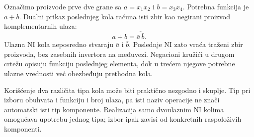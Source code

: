 
Označimo proizvode prve dve grane sa \(a=x_1x_2\) i \(b=x_3x_4\). Potrebna funkcija je \(a+b\). Dualni prikaz poslednjeg kola računa isti zbir kao negirani proizvod komplementarnih ulaza:
\[
a+b=\overline{\bar{a}\,\bar{b}}.
\]
Ulazna NI kola neposredno stvaraju \(\bar{a}\) i \(\bar{b}\). Poslednje NI zato vraća traženi zbir proizvoda, bez zasebnih invertora na međuvezi. Negacioni kružići u drugom crtežu opisuju funkciju poslednjeg elementa, dok u trećem njegove potrebne ulazne vrednosti već obezbeđuju prethodna kola.

Korišćenje dva različita tipa kola može biti praktično nezgodno i skuplje. Tip pri izboru obuhvata i funkciju i broj ulaza, pa isti naziv operacije ne znači automatski isti tip komponente. Realizacija samo dvoulaznim NI kolima omogućava upotrebu jednog tipa; izbor ipak zavisi od konkretnih raspoloživih komponenti.
